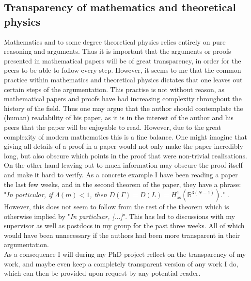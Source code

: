 \documentclass[a4paper, 11pt]{article} %
\begin{document}
\subsection*{Transparency of mathematics and theoretical physics}
Mathematics and to some degree theoretical physics relies entirely on pure reasoning and arguments. Thus it is important that the arguments or proofs presented in mathematical papers will be of great transparency, in order for the peers to be able to follow every step. However, it seems to me that the common practice within mathematics and theoretical physics dictates that one leaves out certain steps of the argumentation. This practise is not without reason, as mathematical papers and proofs have had increasing complexity throughout the history of the field. Thus one may argue that the author should contemplate the (human) readability of his paper, as it is in the interest of the author and his peers that the paper will be enjoyable to read. However, due to the great complexity of modern mathematics this is a fine balance. One might imagine that giving all details of a proof in a paper would not only make the paper incredibly long, but also obscure which points in the proof that were non-trivial realisations. On the other hand leaving out to much information may obscure the proof itself and make it hard to verify. As a concrete example I have been reading a paper the last few weeks, and in the second theorem of the paper, they have a phrase: "\emph{In particular, if} $ \Lambda(m)< 1 $\emph{, then }$ D(\Gamma)=D(L)=H^1_{\text{as}}(\mathbb{R}^{3(N-1)}) $." \cite{Moser_2017}. However, this does not seem to follow from the rest of the theorem which is otherwise implied by "\emph{In particluar, [...]}". This has led to discussions with my supervisor as well as postdocs in my group for the past three weeks. All of which would have been unnecessary if the authors had been more transparent in their argumentation.\\
As a consequence I will during my PhD project reflect on the transparency of my work, and maybe even keep a completely transparent version of any work I do, which can then be provided upon request by any potential reader.




\end{document}
